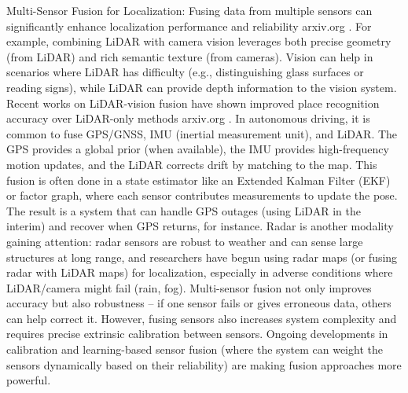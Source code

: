     Multi-Sensor Fusion for Localization: Fusing data from multiple sensors can significantly enhance localization performance and reliability​
    arxiv.org
    . For example, combining LiDAR with camera vision leverages both precise geometry (from LiDAR) and rich semantic texture (from cameras). Vision can help in scenarios where LiDAR has difficulty (e.g., distinguishing glass surfaces or reading signs), while LiDAR can provide depth information to the vision system. Recent works on LiDAR-vision fusion have shown improved place recognition accuracy over LiDAR-only methods​
    arxiv.org
    . In autonomous driving, it is common to fuse GPS/GNSS, IMU (inertial measurement unit), and LiDAR. The GPS provides a global prior (when available), the IMU provides high-frequency motion updates, and the LiDAR corrects drift by matching to the map. This fusion is often done in a state estimator like an Extended Kalman Filter (EKF) or factor graph, where each sensor contributes measurements to update the pose. The result is a system that can handle GPS outages (using LiDAR in the interim) and recover when GPS returns, for instance. Radar is another modality gaining attention: radar sensors are robust to weather and can sense large structures at long range, and researchers have begun using radar maps (or fusing radar with LiDAR maps) for localization, especially in adverse conditions where LiDAR/camera might fail (rain, fog). Multi-sensor fusion not only improves accuracy but also robustness – if one sensor fails or gives erroneous data, others can help correct it. However, fusing sensors also increases system complexity and requires precise extrinsic calibration between sensors. Ongoing developments in calibration and learning-based sensor fusion (where the system can weight the sensors dynamically based on their reliability) are making fusion approaches more powerful.

